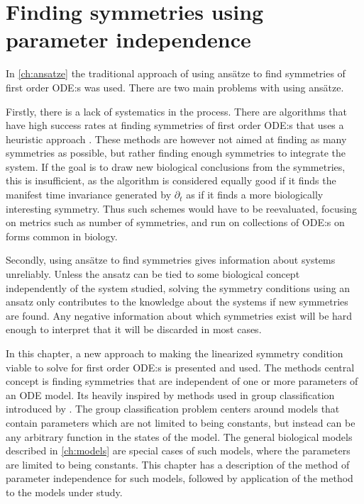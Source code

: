 \chapter{Finding symmetries using parameter independence} \label{ch:param-ind}

In \cref{ch:ansatze} the traditional approach of using ansätze to find symmetries of first order ODE:s was used.
There are two main problems with using ansätze.

Firstly, there is a lack of systematics in the process.
There are algorithms that have high success rates at finding symmetries of first order ODE:s that uses a heuristic approach \cite{chebterrab1997computer,chebterrab1998patterns}.
These methods are however not aimed at finding as many symmetries as possible, but rather finding enough symmetries to integrate the system.
If the goal is to draw new biological conclusions from the symmetries, this is insufficient, as the algorithm is considered equally good if it finds the manifest time invariance generated by \(\partial_t\) as if it finds a more biologically interesting symmetry.
Thus such schemes would have to be reevaluated, focusing on metrics such as number of symmetries, and run on collections of ODE:s on forms common in biology.

Secondly, using ansätze to find symmetries gives information about systems unreliably.
Unless the ansatz can be tied to some biological concept independently of the system studied, solving the symmetry conditions using an ansatz only contributes to the knowledge about the systems if new symmetries are found.
Any negative information about which symmetries exist will be hard enough to interpret that it will be discarded in most cases.

In this chapter, a new approach to making the linearized symmetry condition viable to solve for first order ODE:s is presented and used.
The methods central concept is finding symmetries that are independent of one or more parameters of an ODE model.
Its heavily inspired by methods used in group classification introduced by \citeauthor{ovsiannikov1982group} \cite{ovsiannikov1982group}.
The group classification problem centers around models that contain parameters which are not limited to being constants, but instead can be any arbitrary function in the states of the model.
The general biological models described in \cref{ch:models} are special cases of such models, where the parameters are limited to being constants.
This chapter has a description of the method of parameter independence for such models, followed by application of the method to the models under study.

